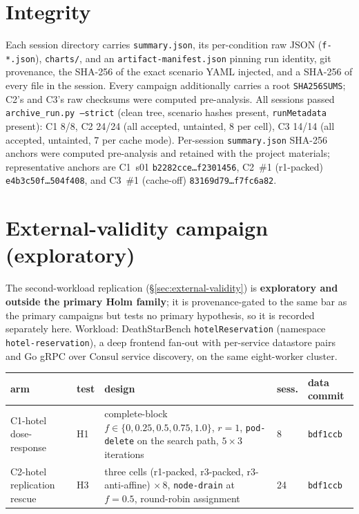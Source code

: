 \section{Integrity}\label{sec:integrity}

Each session directory carries \texttt{summary.json}, its per-condition raw JSON
(\texttt{f-*.json}), \texttt{charts/}, and an \texttt{artifact-manifest.json}
pinning run identity, git provenance, the SHA-256 of the exact scenario YAML
injected, and a SHA-256 of every file in the session. Every campaign additionally
carries a root \texttt{SHA256SUMS}; C2's and C3's raw checksums were computed
pre-analysis. All sessions passed
\texttt{archive\_run.py --strict} (clean tree, scenario hashes present,
\texttt{runMetadata} present): C1 8/8, C2 24/24 (all accepted, untainted, 8 per
cell), C3 14/14 (all accepted, untainted, 7 per cache mode). Per-session
\texttt{summary.json} SHA-256 anchors were computed pre-analysis and retained
with the project materials; representative anchors are
C1~s01 \texttt{b2282cce\ldots f2301456},
C2~\#1 (r1-packed) \texttt{e4b3c50f\ldots 504f408}, and
C3~\#1 (cache-off) \texttt{83169d79\ldots f7fc6a82}.

\section{External-validity campaign (exploratory)}\label{sec:hotel-provenance}

The second-workload replication (\S\ref{sec:external-validity}) is
\textbf{exploratory and outside the primary Holm family}; it is provenance-gated
to the same bar as the primary campaigns but tests no primary
hypothesis, so it is recorded separately here. Workload: DeathStarBench
\texttt{hotelReservation} (namespace \texttt{hotel-reservation}), a deep frontend
fan-out with per-service datastore pairs and Go gRPC over Consul service
discovery, on the same eight-worker cluster.

\begin{center}
\footnotesize
\setlength{\tabcolsep}{4pt}
\begin{tabular}{p{}p{}p{}p{}p{}}
\toprule
\textbf{arm} & \textbf{test} & \textbf{design} & \textbf{sess.} & \textbf{data commit} \\
\midrule
C1-hotel dose-response & H1 & complete-block $f \in \{0,0.25,0.5,0.75,1.0\}$, $r{=}1$, \texttt{pod-delete} on the search path, $5\times3$ iterations & 8 & \texttt{bdf1ccb} \\
\addlinespace
C2-hotel replication rescue & H3 & three cells (r1-packed, r3-packed, r3-anti-affine) $\times\,8$, \texttt{node-drain} at $f{=}0.5$, round-robin assignment & 24 & \texttt{bdf1ccb} \\
\bottomrule
\end{tabular}
\end{center}

